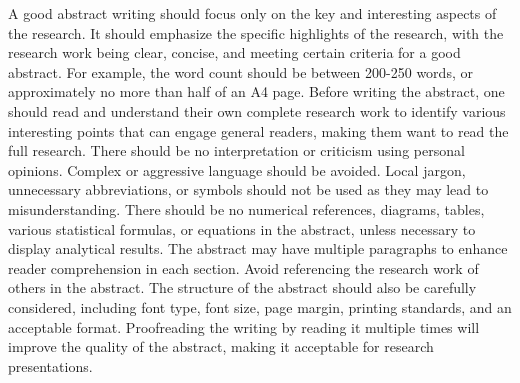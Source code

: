 A good abstract writing should focus only on the key and interesting aspects of
the research. It should emphasize the specific highlights of the research, with the
research work being clear, concise, and meeting certain criteria for a good abstract. For
example, the word count should be between 200-250 words, or approximately no
more than half of an A4 page. Before writing the abstract, one should read and
understand their own complete research work to identify various interesting points
that can engage general readers, making them want to read the full research. There
should be no interpretation or criticism using personal opinions. Complex or aggressive
language should be avoided. Local jargon, unnecessary abbreviations, or symbols
should not be used as they may lead to misunderstanding. There should be no
numerical references, diagrams, tables, various statistical formulas, or equations in the
abstract, unless necessary to display analytical results.
The abstract may have multiple paragraphs to enhance reader comprehension
in each section. Avoid referencing the research work of others in the abstract. The
structure of the abstract should also be carefully considered, including font type, font
size, page margin, printing standards, and an acceptable format. Proofreading the
writing by reading it multiple times will improve the quality of the abstract, making it
acceptable for research presentations.